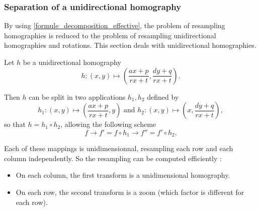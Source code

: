 \subsubsection{Separation of a unidirectional homography}

By using \eqref{formule_decomposition_effective}, the problem of resampling homographies is reduced to the problem of resampling unidirectional homographies and rotations. This section deals with unidirectional homographies.



\label{homobox_paragraph}


Let $h$ be a unidirectional homography 
\begin{equation*}
h:(x,y)\mapsto \left(\frac{ax+p}{rx+t},\frac{dy+q}{rx+t}\right).
\end{equation*}

Then $h$ can be split in two applications $h_1 , h_2$ defined by
\begin{equation*}
h_1:(x,y) \mapsto \left(\frac{ax+p}{rx+t},y\right) \text{ and } h_2:(x,y) \mapsto \left(x,\frac{dy+q}{rx+t}\right),
\end{equation*}
so that $h=h_1  \circ h_2$, allowing the following scheme
\begin{equation*}
f\longrightarrow f'=f\circ h_1 \longrightarrow f''=f'\circ h_2.
\end{equation*}

Each of these mappings is unidimensionnal, resampling each row and each column independently. So the resampling can be computed efficiently :

\begin{itemize}
\item On each column, the first transform is a unidimensional homography.%
\item On each row, the second transform is a zoom (which factor is different for each row).%
\end{itemize}

